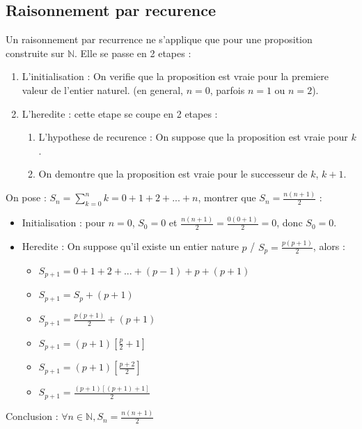 \documentclass[a4paper,10pt]{book}
\begin{document}
	\subsection{Raisonnement par recurence}
	\begin{prop}
		Un raisonnement par recurrence ne s'applique que pour une proposition construite sur $\mathbb{N}$.
		Elle se passe en 2 etapes :
		\begin{enumerate}
			\item L'initialisation : On verifie que la proposition est vraie pour la premiere valeur de l'entier naturel. (en general, $n=0$, parfois $n=1$ ou $n=2$).
			\item L'heredite : cette etape se coupe en 2 etapes :
				\begin{enumerate}
					\item L'hypothese de recurence : On suppose que la proposition est vraie pour $k$.
					\item On demontre que la proposition est vraie pour le successeur de $k$, $k+1$.
				\end{enumerate}
		\end{enumerate}
	\end{prop}

	\exemple On pose : $S_{n} = \sum_{k=0}^{n}k = 0 + 1+ 2 + ... + n  $, montrer que $S_{n} = \frac{n(n+1)}{2}$ :
		\begin{itemize}
			\item Initialisation : pour $n=0$, $S_{0} = 0$ et $\frac{n(n+1)}{2} = \frac{0(0+1)}{2} = 0$, donc $S_{0} = 0$.
			\item Heredite : On suppose qu'il existe un entier nature $p$ / $S_{p} = \frac{p(p+1)}{2}$, alors :

				\begin{itemize}
				\item $S_{p+1} = 0 + 1 + 2 + ... + (p - 1) + p + (p + 1)$
				\item $S_{p+1} =          S_{p}                + (p + 1)$
				\item $S_{p+1} = \frac{p(p+1)}{2} + (p+1)$
				\item $S_{p+1} = (p+1)[\frac{p}{2} +1]$
				\item $S_{p+1} = (p+1)[\frac{p+2}{2}]$
				\item $S_{p+1} = \frac{(p+1)[(p+1)+1]}{2}$
		\end{itemize}
		\end{itemize}

		Conclusion : $\forall n \in \mathbb{N}, S_{n} = \frac{n(n+1)}{2}$
\end{document}
